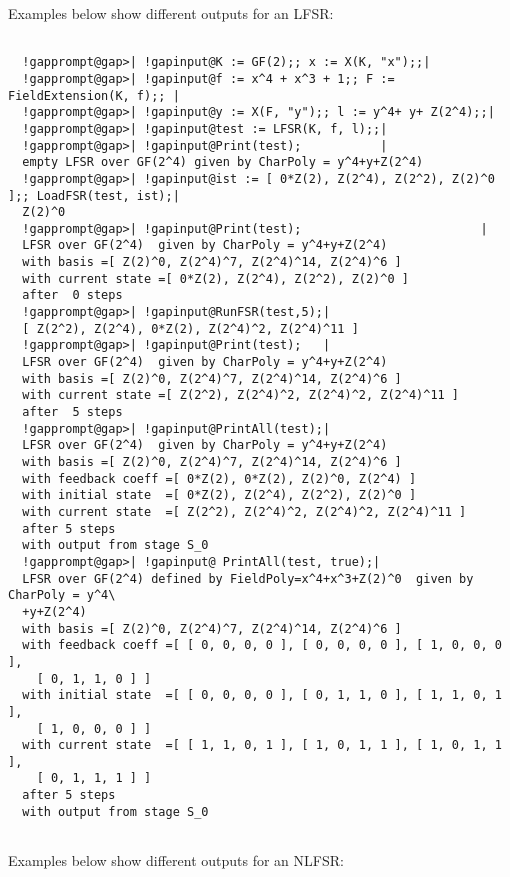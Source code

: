 \documentclass[a4paper,11pt]{report}
\begin{document}
{{{ Examples below show different outputs for an LFSR: 
\begin{Verbatim}[commandchars=!@|,fontsize=\small,frame=single,label=Example]
  
  !gapprompt@gap>| !gapinput@K := GF(2);; x := X(K, "x");;|
  !gapprompt@gap>| !gapinput@f := x^4 + x^3 + 1;; F := FieldExtension(K, f);; |
  !gapprompt@gap>| !gapinput@y := X(F, "y");; l := y^4+ y+ Z(2^4);;|
  !gapprompt@gap>| !gapinput@test := LFSR(K, f, l);;|
  !gapprompt@gap>| !gapinput@Print(test);           |
  empty LFSR over GF(2^4) given by CharPoly = y^4+y+Z(2^4)
  !gapprompt@gap>| !gapinput@ist := [ 0*Z(2), Z(2^4), Z(2^2), Z(2)^0 ];; LoadFSR(test, ist);|
  Z(2)^0
  !gapprompt@gap>| !gapinput@Print(test);                         |
  LFSR over GF(2^4)  given by CharPoly = y^4+y+Z(2^4)
  with basis =[ Z(2)^0, Z(2^4)^7, Z(2^4)^14, Z(2^4)^6 ]
  with current state =[ 0*Z(2), Z(2^4), Z(2^2), Z(2)^0 ]
  after  0 steps
  !gapprompt@gap>| !gapinput@RunFSR(test,5);|
  [ Z(2^2), Z(2^4), 0*Z(2), Z(2^4)^2, Z(2^4)^11 ]
  !gapprompt@gap>| !gapinput@Print(test);   |
  LFSR over GF(2^4)  given by CharPoly = y^4+y+Z(2^4)
  with basis =[ Z(2)^0, Z(2^4)^7, Z(2^4)^14, Z(2^4)^6 ]
  with current state =[ Z(2^2), Z(2^4)^2, Z(2^4)^2, Z(2^4)^11 ]
  after  5 steps
  !gapprompt@gap>| !gapinput@PrintAll(test);|
  LFSR over GF(2^4)  given by CharPoly = y^4+y+Z(2^4)
  with basis =[ Z(2)^0, Z(2^4)^7, Z(2^4)^14, Z(2^4)^6 ]
  with feedback coeff =[ 0*Z(2), 0*Z(2), Z(2)^0, Z(2^4) ]
  with initial state  =[ 0*Z(2), Z(2^4), Z(2^2), Z(2)^0 ]
  with current state  =[ Z(2^2), Z(2^4)^2, Z(2^4)^2, Z(2^4)^11 ]
  after 5 steps
  with output from stage S_0
  !gapprompt@gap>| !gapinput@ PrintAll(test, true);|
  LFSR over GF(2^4) defined by FieldPoly=x^4+x^3+Z(2)^0  given by CharPoly = y^4\
  +y+Z(2^4)
  with basis =[ Z(2)^0, Z(2^4)^7, Z(2^4)^14, Z(2^4)^6 ]
  with feedback coeff =[ [ 0, 0, 0, 0 ], [ 0, 0, 0, 0 ], [ 1, 0, 0, 0 ], 
    [ 0, 1, 1, 0 ] ]
  with initial state  =[ [ 0, 0, 0, 0 ], [ 0, 1, 1, 0 ], [ 1, 1, 0, 1 ], 
    [ 1, 0, 0, 0 ] ]
  with current state  =[ [ 1, 1, 0, 1 ], [ 1, 0, 1, 1 ], [ 1, 0, 1, 1 ], 
    [ 0, 1, 1, 1 ] ]
  after 5 steps
  with output from stage S_0
  
\end{Verbatim}
 Examples below show different outputs for an NLFSR: 
\begin{Verbatim}[commandchars=!@|,fontsize=\small,frame=single,label=Example]
  

\end{Verbatim}}}}
\end{document}
